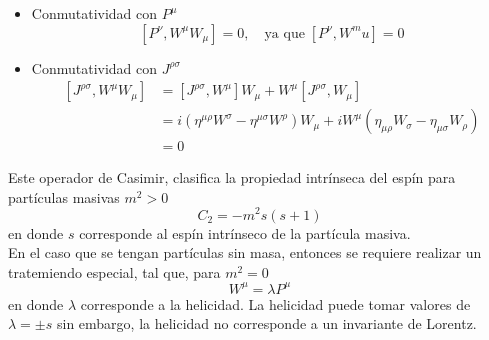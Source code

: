 \documentclass[12pt,letterpaper]{article}
\begin{document}
    \begin{itemize}
      \item Conmutatividad con $P^\mu$
      \begin{equation}
        \left[ P^\nu , W^\mu W_\mu \right] = 0, \quad \text{ya que}\; \left[ P^\nu,W^mu \right]=0
       \end{equation}
       \item Conmutatividad con $J^{\rho\sigma}$
       \begin{equation}
         \begin{aligned}
         \left[ J^{\rho\sigma} , W^\mu W_\mu \right] & = \left[ J^{\rho\sigma} , W^\mu \right] W_\mu + W^\mu \left[ J^{\rho\sigma} , W_\mu \right] \\
         & = i \left( \eta^{\mu\rho} W^\sigma - \eta^{\mu \sigma} W^\rho \right) W_\mu + iW^\mu \left( \eta_{\mu\rho} W_\sigma - \eta_{\mu\sigma} W_\rho \right) \\
         &  = 0
        \end{aligned}
      \end{equation}
    \end{itemize}
    Este operador de Casimir, clasifica la propiedad intrínseca del espín para partículas masivas $m^2>0$
    \begin{equation}
      C_2 = -m^2 s \left( s+1 \right)
     \end{equation}
    en donde $s$ corresponde al espín intrínseco de la partícula masiva. \\
    En el caso que se tengan partículas sin masa, entonces se requiere realizar un tratemiendo especial, tal que, para $m^2=0$
    \begin{equation}
      W^\mu = \lambda P^\mu
     \end{equation}
     en donde $\lambda$ corresponde a la helicidad. La helicidad puede tomar valores de $\lambda=\pm s$ sin embargo, la helicidad no corresponde a un invariante de Lorentz. 
\end{document}
